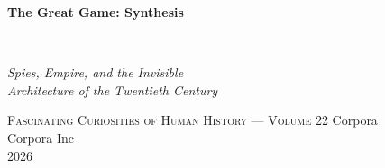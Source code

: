 \clearpage
\vspace*{1.5in}
\begin{center}
  \begin{minipage}{\textwidth}
    \centering
    \Huge\bfseries
    \linespread{1.25}\selectfont
    The Great Game: Synthesis
  \end{minipage}
  \\[3em]
  {\Large\itshape\linespread{1.3}\selectfont
  Spies, Empire, and the Invisible\\
  Architecture of the Twentieth Century\par}
  \vspace{2em}
  {\small\scshape Fascinating Curiosities of Human History — Volume 22}
  \vfill
  {\large Corpora}
  \\[1em]
  {\large Corpora Inc}
  \\[1em]
  {\large 2026}
\end{center}
\clearpage
